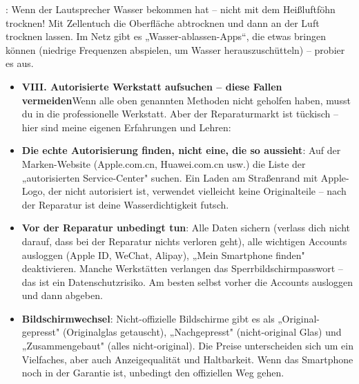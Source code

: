 
: Wenn der Lautsprecher Wasser bekommen hat – nicht mit dem Heißluftföhn trocknen! Mit Zellentuch die Oberfläche abtrocknen und dann an der Luft trocknen lassen. Im Netz gibt es „Wasser-ablassen-Apps“, die etwas bringen können (niedrige Frequenzen abspielen, um Wasser herauszuschütteln) – probier es aus.

\begin{itemize}
  \item \textbf{VIII. Autorisierte Werkstatt aufsuchen – diese Fallen vermeiden}Wenn alle oben genannten Methoden nicht geholfen haben, musst du in die professionelle Werkstatt. Aber der Reparaturmarkt ist tückisch – hier sind meine eigenen Erfahrungen und Lehren:
  \item \textbf{Die echte Autorisierung finden, nicht eine, die so aussieht}: Auf der Marken-Website (Apple.com.cn, Huawei.com.cn usw.) die Liste der „autorisierten Service-Center" suchen. Ein Laden am Straßenrand mit Apple-Logo, der nicht autorisiert ist, verwendet vielleicht keine Originalteile – nach der Reparatur ist deine Wasserdichtigkeit futsch.
  \item \textbf{Vor der Reparatur unbedingt tun}: Alle Daten sichern (verlass dich nicht darauf, dass bei der Reparatur nichts verloren geht), alle wichtigen Accounts ausloggen (Apple ID, WeChat, Alipay), „Mein Smartphone finden" deaktivieren. Manche Werkstätten verlangen das Sperrbildschirmpasswort – das ist ein Datenschutzrisiko. Am besten selbst vorher die Accounts ausloggen und dann abgeben.
  \item \textbf{Bildschirmwechsel}: Nicht-offizielle Bildschirme gibt es als „Original-gepresst" (Originalglas getauscht), „Nachgepresst" (nicht-original Glas) und „Zusammengebaut" (alles nicht-original). Die Preise unterscheiden sich um ein Vielfaches, aber auch Anzeigequalität und Haltbarkeit. Wenn das Smartphone noch in der Garantie ist, unbedingt den offiziellen Weg gehen.
\end{itemize}


